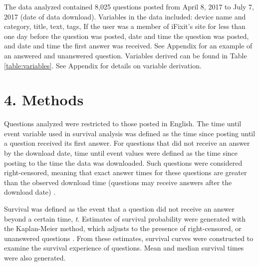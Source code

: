 \documentclass{article}
\begin{document}
The data analyzed contained 8,025 questions posted from April 8, 2017 to July 7, 2017 (date of data download). Variables in the data included: device name and category, title, text, tags, If the user was a member of iFixit's site for less than one day before the question was posted, date and time the question was posted, and date and time the first answer was received. See Appendix for an example of an answered and unanswered question. Variables derived can be found in Table \ref{table:variables}. See Appendix for details on variable derivation. 


\section*{4. Methods}

Questions analyzed were restricted to those posted in English. The time until event variable used in survival analysis was defined as the time since posting until a question received its first answer. For questions that did not receive an answer by the download date, time until event values were defined as the time since posting to the time the data was downloaded. Such questions were considered right-censored, meaning that exact answer times for these questions are greater than the observed download time (questions may receive answers after the download date) \cite{Kleinbaum2011}. 

Survival was defined as the event that a question did not receive an answer beyond a certain time, \textit{t}. Estimates of survival probability were generated with the Kaplan-Meier method, which adjusts to the presence of right-censored, or unanswered questions \cite{Bland1998}. From these estimates, survival curves were constructed to examine the survival experience of questions. Mean and median survival times were also generated. 
\end{document}
